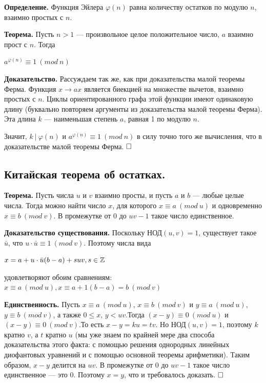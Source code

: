 \documentclass[a4paper, 10pt]{article}
\begin{document}
\textbf{Определение.} Функция Эйлера $\varphi(n)$ равна количеству остатков по модулю $n$, взаимно простых с $n$.

\textbf{Теорема.} Пусть $n > 1$ — произвольное целое положительное число, $a$ взаимно прост с $n$. Тогда

\begin{center}
    $\displaystyle a^{\varphi(n)} \equiv 1 \ (mod \ n)$
\end{center}

\textbf{Доказательство.} Рассуждаем так же, как при доказательства малой теоремы Ферма. Функция $x \to a x$ является биекцией на множестве вычетов, взаимно простых с $n$. Циклы ориентированного графа этой функции имеют одинаковую длину (буквально повторяем аргументы из доказательства малой теоремы Ферма). Эта длина $k$ — наименьшая степень $a$, равная 1 по модулю $n$.

Значит, $k \ | \ \varphi(n)$ и $a^{\varphi(n)} \equiv 1 \ (mod \ n)$ в силу точно того же вычисления, что в доказательстве малой теоремы Ферма. $\hfill \square$

\subsection{Китайская теорема об остатках.}

\textbf{Теорема.} Пусть числа $u$ и $v$ взаимно просты, и пусть $a$ и $b$ — любые целые числа. Тогда можно найти число $x$, для которого $x \equiv a \ (mod \ u)$ и одновременно $x \equiv b \ (mod \ v)$. В промежутке от 0 до $u v - 1$ такое число единственное.

\textbf{Доказательство существования.} Поскольку НОД$(u, v) = 1$, существует такое $\bar u$, что $u \cdot \bar u \equiv 1 \ (mod \ v)$. Поэтому числа вида

\begin{center}
    $\displaystyle x = a + u \cdot \bar u (b - a) + s u v, s \in \mathbb{Z}$
\end{center}

удовлетворяют обоим сравнениям: $x \equiv a \ (mod \ u), x \equiv a + 1(b - a) = b \ (mod \ v)$

\textbf{Единственность.} Пусть $x \equiv a \ (mod \ u)$, $x \equiv b \ (mod \ v)$ и $y \equiv a \ (mod \ u)$, $y \equiv b \ (mod  \ v)$, а также $0 \leqslant x$, $y < u v$.Тогда $(x - y)  \equiv 0 \ (mod \ u)$ и $(x - y) \equiv 0 \ (mod \ v)$.То есть $x - y = k u = t v$. Но НОД$(u, v) = 1$, поэтому $k$ кратно $v$, а $t$ кратно $u$ (мы уже знаем по крайней мере два способа доказательства этого факта: с помощью решения однородных линейных диофантовых уравнений и с помощью основной теоремы арифметики). Таким образом, $x - y$ делится на $u v$. В промежутке от 0 до $u v - 1$ такое число единственное — это 0. Поэтому $x = y$, что и требовалось доказать. $\hfill \square$
\end{document}
